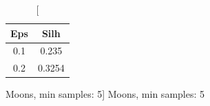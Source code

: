 \documentclass{classrep}
\begin{document}
{{{\begin{table}[!htbp]
\begin{minipage}{.24\textwidth}
                        \label{db_scan_table_Moons_eucl_min_sample4}
                    \end{minipage}
                    \hfill
                    \begin{minipage}{.24\textwidth}
                        \centering
                        \begin{tabular}{|c|c|}
                            \hline
                            Eps & Silh \\ \hline
                            0.1 & 0.235 \\ \hline
                            0.2 & 0.3254 \\ \hline
                        \end{tabular}
                        \caption
                        [Moons, min samples: 5]
                        {Moons, min samples: 5}
                        \label{db_scan_table_Moons_eucl_min_sample5}
                    \end{minipage}
                \end{table}
                \FloatBarrier


}}}
\end{document}
